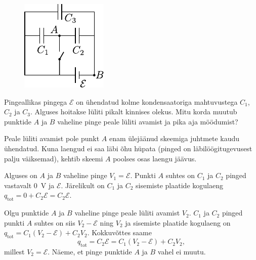 
\begin{figure}
		\vspace{-5pt}
		\includegraphics[width=\linewidth]{2020-lahg-06-yl.pdf}
	\end{figure}
	Pingeallikas pingega $\mathcal E$ on ühendatud kolme kondensaatoriga mahtuvustega $C_1$, $C_2$ ja $C_3$. Alguses hoitakse lüliti pikalt kinnises olekus. Mitu korda muutub punktide $A$ ja $B$ vaheline pinge peale lüliti avamist ja pika aja möödumist? 
	
	
	
\hint

\solu
Peale lüliti avamist pole punkt $A$ enam ülejäänud skeemiga juhtmete kaudu ühendatud. Kuna laengud ei saa läbi õhu hüpata (pinged on läbilöögitugevusest palju väiksemad), kehtib skeemi $A$ poolses osas laengu jäävus.

Alguses on $A$ ja $B$ vaheline pinge $V_1 = \mathcal E$. Punkti $A$ suhtes on $C_1$ ja $C_2$ pinged vastavalt \SI{0}{V} ja $\mathcal E$. Järelikult on $C_1$ ja $C_2$ sisemiste plaatide kogulaeng $q_\mathrm{tot} = 0 + C_2\mathcal E = C_2\mathcal E$.

Olgu punktide $A$ ja $B$ vaheline pinge peale lüliti avamist $V_2$. $C_1$ ja $C_2$ pinged punkti $A$ suhtes on siis $V_2 - \mathcal E$ ning $V_2$ ja sisemiste plaatide kogulaeng on $q_\mathrm{tot} = C_1(V_2 - \mathcal E) + C_2V_2$. Kokkuvõttes saame
\[
q_\mathrm{tot} = C_2\mathcal E = C_1(V_2 - \mathcal E) + C_2V_2,
\]
millest $V_2=\mathcal E$. Näeme, et pinge punktide $A$ ja $B$ vahel ei muutu.
\probend